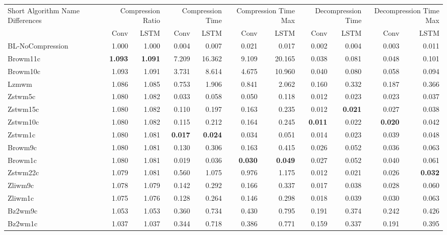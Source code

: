 \begin{tabular}{lrrrrrrrrrr}
\toprule
\multicolumn{1}{p{2.5cm}}{Short Algorithm Name Differences} & \multicolumn{2}{p{2cm}}{Compression Ratio} & \multicolumn{2}{p{2cm}}{Compression Time} & \multicolumn{2}{p{2cm}}{Compression Time Max} & \multicolumn{2}{p{2cm}}{Decompression Time} & \multicolumn{2}{p{2cm}}{Decompression Time Max} \\
 & Conv & LSTM & Conv & LSTM & Conv & LSTM & Conv & LSTM & Conv & LSTM \\
\midrule
BL-NoCompression & 1.000 & 1.000 & 0.004 & 0.007 & 0.021 & 0.017 & 0.002 & 0.004 & 0.003 & 0.011 \\
Browm11c & \bfseries 1.093 & \bfseries 1.091 & 7.209 & 16.362 & 9.109 & 20.165 & 0.038 & 0.081 & 0.048 & 0.101 \\
Browm10c & 1.093 & 1.091 & 3.731 & 8.614 & 4.675 & 10.960 & 0.040 & 0.080 & 0.058 & 0.094 \\
Lzmwm & 1.086 & 1.085 & 0.753 & 1.906 & 0.841 & 2.062 & 0.160 & 0.332 & 0.187 & 0.366 \\
Zstwm5c & 1.080 & 1.082 & 0.033 & 0.058 & 0.050 & 0.118 & 0.012 & 0.023 & 0.023 & 0.037 \\
Zstwm15c & 1.080 & 1.082 & 0.110 & 0.197 & 0.163 & 0.235 & 0.012 & \bfseries 0.021 & 0.027 & 0.038 \\
Zstwm10c & 1.080 & 1.082 & 0.115 & 0.212 & 0.164 & 0.245 & \bfseries 0.011 & 0.022 & \bfseries 0.020 & 0.042 \\
Zstwm1c & 1.080 & 1.081 & \bfseries 0.017 & \bfseries 0.024 & 0.034 & 0.051 & 0.014 & 0.023 & 0.039 & 0.048 \\
Browm9c & 1.080 & 1.081 & 0.130 & 0.306 & 0.163 & 0.415 & 0.026 & 0.052 & 0.036 & 0.063 \\
Browm1c & 1.080 & 1.081 & 0.019 & 0.036 & \bfseries 0.030 & \bfseries 0.049 & 0.027 & 0.052 & 0.040 & 0.061 \\
Zstwm22c & 1.079 & 1.081 & 0.560 & 1.075 & 0.976 & 1.175 & 0.012 & 0.021 & 0.026 & \bfseries 0.032 \\
Zliwm9c & 1.078 & 1.079 & 0.142 & 0.292 & 0.166 & 0.337 & 0.017 & 0.038 & 0.028 & 0.060 \\
Zliwm1c & 1.075 & 1.076 & 0.128 & 0.264 & 0.146 & 0.298 & 0.018 & 0.039 & 0.030 & 0.063 \\
Bz2wm9c & 1.053 & 1.053 & 0.360 & 0.734 & 0.430 & 0.795 & 0.191 & 0.374 & 0.242 & 0.426 \\
Bz2wm1c & 1.037 & 1.037 & 0.344 & 0.718 & 0.386 & 0.771 & 0.159 & 0.337 & 0.191 & 0.395 \\
\bottomrule
\end{tabular}
